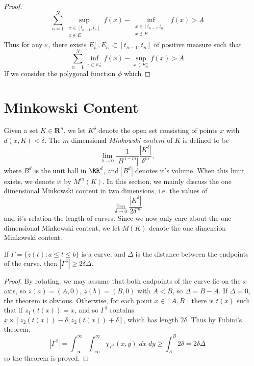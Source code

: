 \begin{proof}
  \[ \sum_{n = 1}^N \sup_{\substack{x \in [t_{n-1},t_n]\\x \not \in E}} f(x) - \inf_{\substack{x \in [t_{n-1},t_n]\\x \not \in E}} f(x) > A \]
  Thus for any $\varepsilon$, there exists $E_n^+, E_n^- \subset [t_{n-1},t_n]$ of positive measure such that
  \[ \sum_{n = 1}^N \inf_{x \in E_n^+} f(x) - \sup_{x \in E_n^-} f(x) > A \]
  If we consider the polygonal function $\phi$ which
\end{proof}

\section{Minkowski Content}

Given a set $K \in \mathbf{R}^n$, we let $K^\delta$ denote the open set consisting of points $x$ with $d(x,K) < \delta$. The $m$ dimensional \emph{Minkowski content} of $K$ is defined to be
%
\[ \lim_{\delta \to 0} \frac{1}{|B^{n-m}|} \frac{|K^\delta|}{\delta^m}, \]
%
where $B^d$ is the unit ball in $\RR^d$, and $|B^d|$ denotes it's volume. When this limit exists, we denote it by $M^m(K)$. In this section, we mainly discuss the one dimensional Minkowski content in two dimensions, i.e. the values of
%
\[ \lim_{\delta \to 0} \frac{|K^\delta|}{2 \delta^m} \]
%
and it's relation the length of curves. Since we now only care about the one dimensional Minkowski content, we let $M(K)$ denote the one dimension Minkowski content.

\begin{lemma}
  If $\Gamma = \{ z(t): a \leq t \leq b \}$ is a curve, and $\Delta$ is the distance between the endpoints of the curve, then $|\Gamma^\delta| \geq 2 \delta \Delta$.
\end{lemma}
\begin{proof}
  By rotating, we may assume that both endpoints of the curve lie on the $x$ axis, so $z(a) = (A,0)$, $z(b) = (B,0)$ with $A < B$, so $\Delta = B - A$. If $\Delta = 0$, the theorem is obvious. Otherwise, for each point $x \in [A,B]$ there is $t(x)$ such that if $z_1(t(x)) = x$, and so $\Gamma^\delta$ contains $x \times [z_2(t(x)) - \delta, z_2(t(x)) + \delta]$, which has length $2 \delta$. Thus by Fubini's theorem,
  \[ |\Gamma^\delta| = \int_{-\infty}^\infty \int_{-\infty}^\infty \chi_{\Gamma^\delta}(x,y)\; dx \;dy \geq \int_A^B 2 \delta = 2 \delta \Delta \]
  so the theorem is proved.
\end{proof}

